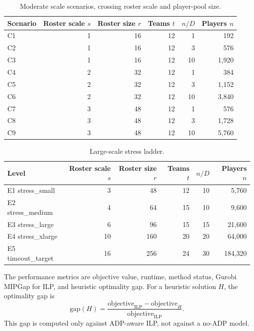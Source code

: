 \documentclass[12pt]{article}
\begin{document}
\begin{table}[H]
\centering
\scriptsize
\setlength{\tabcolsep}{6pt}
\caption{Moderate scale scenarios, crossing roster scale and player-pool size.}
\label{tab:scale-design}
\begin{tabular}{lrrrrr}
\toprule
Scenario & Roster scale \(s\) & Roster size \(r\) & Teams \(t\) & \(n/D\) & Players \(n\)\\
\midrule
C1 & 1 & 16 & 12 & 1 & 192\\
C2 & 1 & 16 & 12 & 3 & 576\\
C3 & 1 & 16 & 12 & 10 & 1,920\\
C4 & 2 & 32 & 12 & 1 & 384\\
C5 & 2 & 32 & 12 & 3 & 1,152\\
C6 & 2 & 32 & 12 & 10 & 3,840\\
C7 & 3 & 48 & 12 & 1 & 576\\
C8 & 3 & 48 & 12 & 3 & 1,728\\
C9 & 3 & 48 & 12 & 10 & 5,760\\
\bottomrule
\end{tabular}
\end{table}

\begin{table}[H]
\centering
\scriptsize
\setlength{\tabcolsep}{4pt}
\caption{Large-scale stress ladder.}
\label{tab:stress}
\begin{tabular}{lrrrrr}
\toprule
Level & Roster scale \(s\) & Roster size \(r\) & Teams \(t\) & \(n/D\) & Players \(n\)\\
\midrule
E1 stress\_small & 3 & 48 & 12 & 10 & 5,760\\
E2 stress\_medium & 4 & 64 & 15 & 10 & 9,600\\
E3 stress\_large & 6 & 96 & 15 & 15 & 21,600\\
E4 stress\_xlarge & 10 & 160 & 20 & 20 & 64,000\\
E5 timeout\_target & 16 & 256 & 24 & 30 & 184,320\\
\bottomrule
\end{tabular}
\end{table}

The performance metrics are objective value, runtime, method status, Gurobi MIPGap for ILP, and heuristic optimality gap. For a heuristic solution \(H\), the optimality gap is
\[
\text{gap}(H)=
\frac{\text{objective}_{\text{ILP}}-\text{objective}_H}
{\text{objective}_{\text{ILP}}}.
\]
This gap is computed only against ADP-aware ILP, not against a no-ADP model.
\end{document}
